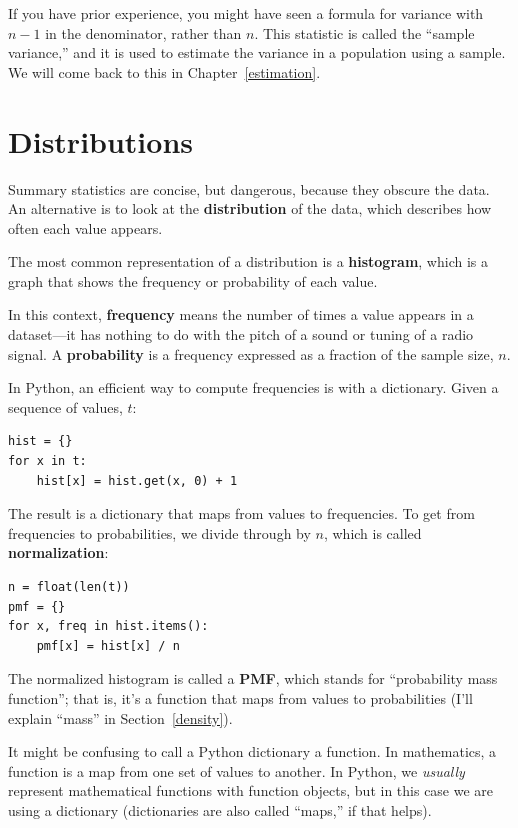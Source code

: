 \documentclass[12pt]{book}
\begin{document}
If you have prior experience, you might have seen a 
formula for variance with $n-1$ in the denominator, rather than $n$.
This statistic is called the ``sample variance,'' and it is used
to estimate the variance in a population using a sample.  We will
come back to this in Chapter~\ref{estimation}.


\section{Distributions}
\label{distributions}

Summary statistics are concise, but dangerous, because they obscure
the data.  An alternative is to look at the {\bf distribution} of the
data, which describes how often each value appears.

The most common representation of a distribution is a {\bf histogram},
which is a graph that shows the frequency or probability
of each value.  

In this context, {\bf frequency} means the number of times a value
appears in a dataset---it has nothing to do with the pitch of a sound
or tuning of a radio signal.  A {\bf probability} is a frequency expressed
as a fraction of the sample size, $n$.

In Python, an efficient way to compute frequencies is with a dictionary.
Given a sequence of values, $t$:

\begin{verbatim}
hist = {}
for x in t:
    hist[x] = hist.get(x, 0) + 1
\end{verbatim}

The result is a dictionary that maps from values to frequencies.
To get from frequencies to probabilities, we divide through by $n$,
which is called {\bf normalization}:

\begin{verbatim}
n = float(len(t))
pmf = {}
for x, freq in hist.items():
    pmf[x] = hist[x] / n
\end{verbatim}

The normalized histogram is called a {\bf PMF}, which stands for
``probability mass function''; that is, it's a function that maps from
values to probabilities (I'll explain ``mass'' in
Section~\ref{density}).

It might be confusing to call a Python dictionary a function.  In
mathematics, a function is a map from one set of values to
another.  In Python, we {\em usually} represent mathematical functions
with function objects, but in this case we are using a dictionary
(dictionaries are also called ``maps,'' if that helps).
\end{document}
